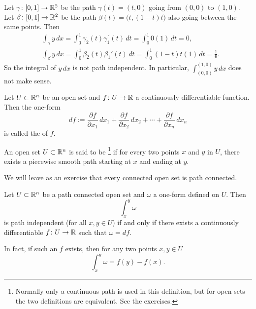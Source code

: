 \begin{example}
Let $\gamma \colon [0,1] \to {\mathbb{R}}^2$ be the path $\gamma(t) = (t,0)$
going from $(0,0)$ to $(1,0)$.  Let $\beta \colon [0,1] \to {\mathbb{R}}^2$ be the path
$\beta(t) = \bigl(t,(1-t)t\bigr)$ also going between the same points.  Then
\begin{align*}
& \int_\gamma y \, dx = 
\int_0^1 \gamma_2(t) \gamma_1^{\:\prime}(t) \, dt
=
\int_0^1 0 (1) \, dt = 0 ,\\
& \int_\beta y \, dx = 
\int_0^1 \beta_2(t) \beta_1'(t) \, dt
=
\int_0^1 (1-t)t(1) \, dt = \frac{1}{6} .
\end{align*}
So the integral of $y\,dx$ is not path independent.
In particular,
$\int_{(0,0)}^{(1,0)} y\,dx$ does not make sense.
\end{example}

\begin{defn}
Let $U \subset {\mathbb{R}}^n$ be an open set and $f \colon U \to {\mathbb{R}}$ a 
continuously differentiable function.  Then the one-form
\begin{equation*}
df :=
\frac{\partial f}{\partial x_1} \, dx_1 + 
\frac{\partial f}{\partial x_2} \, dx_2 + \cdots +
\frac{\partial f}{\partial x_n} \, dx_n 
\end{equation*}
is called the \emph{} of $f$.

An open set $U \subset {\mathbb{R}}^n$ is said to be \emph{}%
\footnote{Normally only a continuous path is used in this definition, but
for open sets the two definitions are equivalent.  See the exercises.}
if for every two points $x$ and $y$ in $U$, there exists a piecewise smooth
path starting at $x$ and ending at $y$.
\end{defn}

We will leave as an exercise that every connected open set is path
connected.

\begin{prop} \label{mv:prop:pathinddf}
Let $U \subset {\mathbb{R}}^n$ be a path connected open set and $\omega$ a one-form
defined on $U$.  Then
\begin{equation*}
\int_x^y \omega
\end{equation*}
is path independent (for all $x,y \in U$) if and only if there exists
a continuously differentiable $f \colon U \to {\mathbb{R}}$ such that $\omega = df$.

In fact, if such an $f$ exists, then for any two points $x,y \in U$
\begin{equation*}
\int_{x}^y \omega = f(y)-f(x) .
\end{equation*}
\end{prop}

